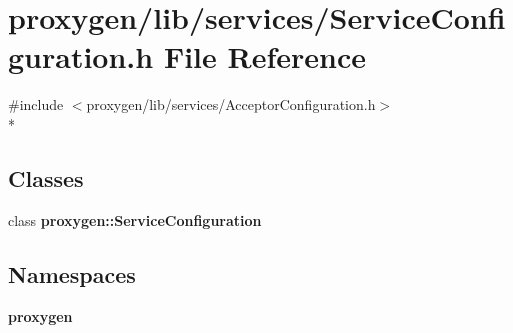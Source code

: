\section{proxygen/lib/services/\+Service\+Configuration.h File Reference}
\label{ServiceConfiguration_8h}
{\ttfamily \#include $<$proxygen/lib/services/\+Acceptor\+Configuration.\+h$>$}\\*
\subsection*{Classes}
\begin{DoxyCompactItemize}
\item 
class {\bf proxygen\+::\+Service\+Configuration}
\end{DoxyCompactItemize}
\subsection*{Namespaces}
\begin{DoxyCompactItemize}
\item 
 {\bf proxygen}
\end{DoxyCompactItemize}
